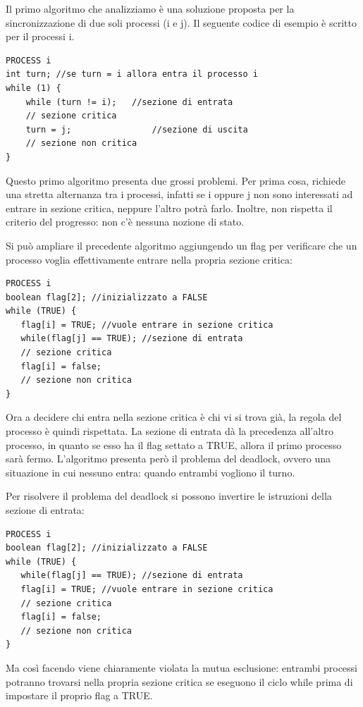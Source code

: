 \documentclass[a4paper]{article}
\begin{document}
Il primo algoritmo che analizziamo è una soluzione proposta per la sincronizzazione di due soli processi (i e j). Il seguente codice di esempio è scritto per il processi i.
\begin{verbatim}
PROCESS i
int turn; //se turn = i allora entra il processo i
while (1) {
    while (turn != i);   //sezione di entrata
    // sezione critica
    turn = j;                //sezione di uscita
    // sezione non critica
}
\end{verbatim}
Questo primo algoritmo presenta due grossi problemi. Per prima cosa, richiede una stretta alternanza tra i processi, infatti se i oppure j non sono interessati ad entrare in sezione critica, neppure l'altro potrà farlo. Inoltre, non rispetta il criterio del progresso: non c'è nessuna nozione di stato.

Si può ampliare il precedente algoritmo aggiungendo un flag per verificare che un processo voglia effettivamente entrare nella propria sezione critica:
\begin{verbatim}
PROCESS i
boolean flag[2]; //inizializzato a FALSE
while (TRUE) {
   flag[i] = TRUE; //vuole entrare in sezione critica
   while(flag[j] == TRUE); //sezione di entrata
   // sezione critica
   flag[i] = false;
   // sezione non critica
}
\end{verbatim}
Ora a decidere chi entra nella sezione critica è chi vi si trova già, la regola del processo è quindi rispettata. La sezione di entrata dà la precedenza all'altro processo, in quanto se esso ha il flag settato a TRUE, allora il primo processo sarà fermo. L'algoritmo presenta però il problema del deadlock, ovvero una situazione in cui nessuno entra: quando entrambi vogliono il turno.

Per risolvere il problema del deadlock si possono invertire le istruzioni della sezione di entrata:
\begin{verbatim}
PROCESS i
boolean flag[2]; //inizializzato a FALSE
while (TRUE) {
   while(flag[j] == TRUE); //sezione di entrata
   flag[i] = TRUE; //vuole entrare in sezione critica
   // sezione critica
   flag[i] = false;
   // sezione non critica
}
\end{verbatim}
Ma così facendo viene chiaramente violata la mutua esclusione: entrambi processi potranno trovarsi nella propria sezione critica se eseguono il ciclo while prima di impostare il proprio flag a TRUE.
\end{document}
